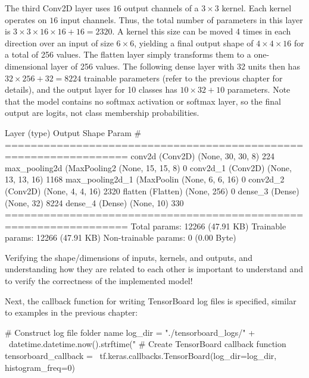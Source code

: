 The third Conv2D layer uses $16$ output channels of a $3 \times 3$ kernel. Each kernel operates on $16$ input channels. Thus, the total number of parameters in this layer is $3 \times 3 \times 16 \times 16 + 16 = 2320$. A kernel this size can be moved 4 times in each direction over an input of size $6 \times 6$, yielding a final output shape of $4 \times 4 \times 16$ for a total of 256 values. The flatten layer simply transforms them to a one-dimensional layer of 256 values. The following dense layer with 32 units then has $32 \times 256 + 32 = 8224$ trainable parameters (refer to the previous chapter for details), and the output layer for 10 classes has $10 \times 32 + 10$ parameters. Note that the model contains no softmax activation or softmax layer, so the final output are logits, not class membership probabilities. 

\begin{textcode}
 Layer (type)                Output Shape              Param #   
=================================================================
 conv2d (Conv2D)             (None, 30, 30, 8)         224       
 max_pooling2d (MaxPooling2  (None, 15, 15, 8)         0         
 conv2d_1 (Conv2D)           (None, 13, 13, 16)        1168      
 max_pooling2d_1 (MaxPoolin  (None, 6, 6, 16)          0         
 conv2d_2 (Conv2D)           (None, 4, 4, 16)          2320      
 flatten (Flatten)           (None, 256)               0         
 dense_3 (Dense)             (None, 32)                8224      
 dense_4 (Dense)             (None, 10)                330       
=================================================================
Total params: 12266 (47.91 KB)
Trainable params: 12266 (47.91 KB)
Non-trainable params: 0 (0.00 Byte)
\end{textcode}

\begin{alertbox}
Verifying the shape/dimensions of inputs, kernels, and outputs, and understanding how they are related to each other is important to understand and to verify the correctness of the implemented model!
\end{alertbox}

Next, the callback function for writing TensorBoard log files is specified, similar to examples in the previous chapter:

\begin{pythoncode}
# Construct log file folder name
log_dir = "./tensorboard_logs/" + \
    datetime.datetime.now().strftime("%
# Create TensorBoard callback function
tensorboard_callback = \
    tf.keras.callbacks.TensorBoard(log_dir=log_dir, histogram_freq=0)
\end{pythoncode}

